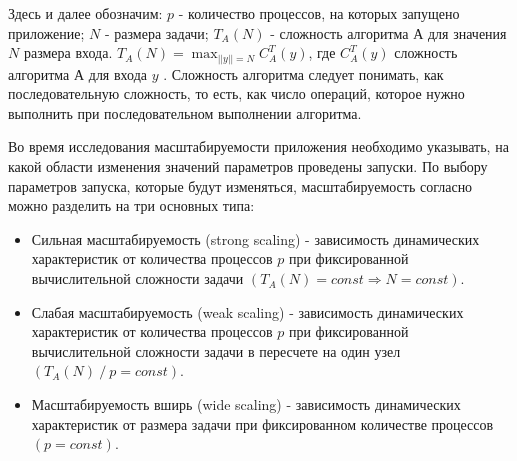 	Здесь и далее обозначим: \(p\) - количество процессов, на которых запущено приложение; \(N\) - размера задачи; \(T_A(N)\) - сложность алгоритма \(А\) для значения \(N\) размера входа. \(T_A(N) = \max_{||y|| = N} C^T_A(y)\), где \(C^T_A(y)\) сложность алгоритма \(А\) для входа \(y\) \cite{COMPLEXITY}. Сложность алгоритма следует понимать, как последовательную сложность, то есть, как число операций, которое нужно выполнить при последовательном выполнении алгоритма.

	Во время исследования масштабируемости приложения необходимо указывать, на какой области изменения значений параметров проведены запуски. По выбору параметров запуска, которые будут изменяться, масштабируемость согласно \cite{scaling_types} можно разделить на три основных типа:
	\begin{itemize}
		\item Сильная масштабируемость (strong scaling) - зависимость динамических характеристик от количества процессов \(p\) при фиксированной вычислительной сложности задачи \((T_A(N) = const \Rightarrow N = const)\).
		\item Слабая масштабируемость (weak scaling) - зависимость динамических характеристик от количества процессов \(p\) при фиксированной вычислительной сложности задачи в пересчете на один узел \((T_A(N)\:/\:p = const)\).
		\item Масштабируемость вширь (wide scaling) - зависимость динамических характеристик от размера задачи при фиксированном количестве процессов \((p = const)\).
	\end{itemize}

